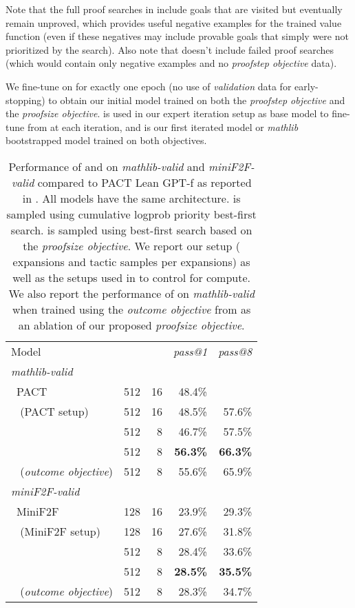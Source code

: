 \documentclass[nohyperref]{article}
\theoremstyle{plain}
\theoremstyle{definition}
\theoremstyle{remark}
\begin{document}
Note that the full proof searches in  include goals that are visited but eventually remain unproved, which provides useful negative examples for the trained value function (even if these negatives may include provable goals that simply were not prioritized by the search). Also note that  doesn't include failed proof searches (which would contain only negative examples and no \textit{proofstep objective} data).

We fine-tune  on  for exactly one epoch (no use of \textit{validation} data for early-stopping) to obtain our initial model  trained on both the \textit{proofstep objective} and the \textit{proofsize objective}.  is used in our expert iteration setup as base model to fine-tune from at each iteration, and  is our first iterated model or \textit{mathlib} bootstrapped model trained on both objectives.

\begin{table}[t]
\caption{Performance of  and  on \textit{mathlib-valid} and \textit{miniF2F-valid} compared to PACT Lean GPT-f as reported in \citet{han2021proof,zheng2021minif2f}. All models have the same architecture.  is sampled using cumulative logprob priority best-first search.  is sampled using best-first search based on the \textit{proofsize objective}. We report our setup ( expansions and  tactic samples per expansions) as well as the setups used in \citet{han2021proof,zheng2021minif2f} to control for compute. We also report the performance of  on \textit{mathlib-valid} when trained using the \textit{outcome objective} from \citet{polu2020generative} as an ablation of our proposed \textit{proofsize objective}.}
\label{fig:bootstrap-eval}
\begin{center}
\begin{small}
\begin{tabular}{lrrrr}
\toprule
Model &  &  & \textit{pass@1} & \textit{pass@8} \\
\cmidrule(r){1-5}
\multicolumn{5}{l}{\textit{mathlib-valid}} \\
~PACT & 512 & 16 & 48.4\% & \\
~ (PACT setup) & 512 & 16 & 48.5\% & 57.6\% \\
~ & 512 & 8 & 46.7\% & 57.5\% \\
~ & 512 & 8 & {\bf 56.3\%} & {\bf 66.3\%} \\  
~ (\textit{outcome objective}) & 512 & 8 & 55.6\% & 65.9\% \\  
\cmidrule(r){1-5}
\multicolumn{5}{l}{\textit{miniF2F-valid}} \\
~MiniF2F & 128 & 16 & 23.9\% & 29.3\% \\
~ (MiniF2F setup) & 128 & 16 & 27.6\% & 31.8\% \\
~ & 512 & 8 & 28.4\% & 33.6\% \\
~ & 512 & 8 & {\bf 28.5\%} & {\bf 35.5\%} \\  
~ (\textit{outcome objective}) & 512 & 8 & 28.3\% & 34.7\% \\
\bottomrule
\end{tabular}
\end{small}
\end{center}
\end{table}
\end{document}
